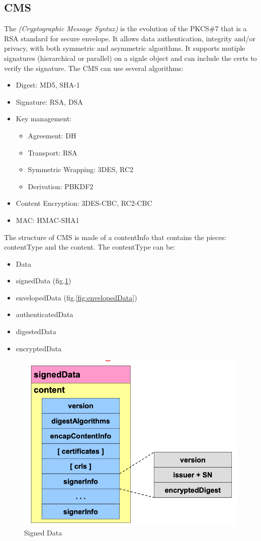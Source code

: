 \documentclass[12pt]{article}
\begin{document}
\subsection{CMS}
The \textit{(Cryptographic Message Syntax)} is the evolution of the PKCS\#7 that is a RSA standard for secure envelope. It allows data authentication, integrity and/or privacy, with both symmetric and asymmetric algorithms. It supports mutiple signatures (hierarchical or parallel) on a signle object and can include the certs to verify the signature. The CMS can use several algorithms:
\begin{itemize}
  \item Digest: MD5, SHA-1
  \item Signature: RSA, DSA
  \item Key management:
  \begin{itemize}
    \item Agreement: DH
    \item Transport: RSA
    \item Symmetric Wrapping: 3DES, RC2
    \item Derivation: PBKDF2
  \end{itemize}
  \item Content Encryption: 3DES-CBC, RC2-CBC
  \item MAC: HMAC-SHA1
\end{itemize}
The structure of CMS is made of a contentInfo that contains the pieces: contentType and the content.
The contentType can be:
\begin{itemize}
  \item Data
  \item signedData (fig.\ref{fig:signedData})
  \item envelopedData (fig.\ref{fig:envelopedData})
  \item authenticatedData
  \item digestedData
  \item encryptedData
\end{itemize}
\begin{figure}[H]
   \centering
   \includegraphics[width=\linewidth]{images/signedData.png}
   \caption{Signed Data}
   \label{fig:signedData}
\end{figure}
\end{document}
